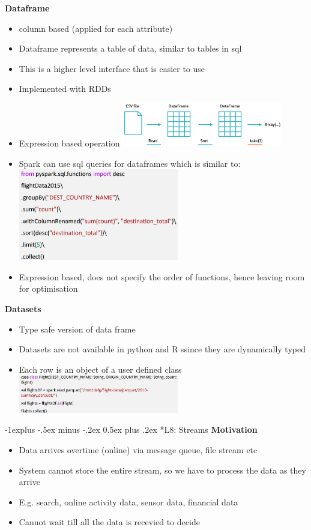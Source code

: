 \documentclass[10pt, landscape]{article}
\makeatletter
\renewcommand{\subsection}{\@startsection{subsection}{2}{0mm}%
                                {-1explus -.5ex minus -.2ex}%
                                {0.5ex plus .2ex}%
                                {\normalfont\normalsize\bfseries}}
\makeatother
\begin{document}
\begin{multicols}{4}
\textbf{Dataframe}
\begin{itemize}
  \item column based (applied for each attribute)
  \item Dataframe represents a table of data, similar to tables in sql 
  \item This is a higher level interface that is easier to use 
  \item Implemented with RDDs 
  \item Expression based operation
  \includegraphics*[width=7cm]{dataframe1}
  \item Spark can use sql queries for dataframes which is similar to:
  \includegraphics*[width=7cm]{df2}
  \item Expression based, does not specify the order of functions, hence leaving room for optimisation 
\end{itemize}

\textbf{Datasets}
\begin{itemize}
  \item Type safe version of data frame
  \item Datasets are not available in python and R ssince they are dynamically typed 
  \item Each row is an object of a user defined class
  \includegraphics*[width=7cm]{ds1}
\end{itemize}


\subsection*{L8: Streams}
\textbf{Motivation}
\begin{itemize}
  \item Data arrives overtime (online) via message queue, file stream etc
  \item System cannot store the entire stream, so we have to process the data as they arrive
  \item E.g. search, online activity data, sensor data, financial data
  \item Cannot wait till all the data is recevied to decide
\end{itemize}


\end{multicols}
\end{document}
